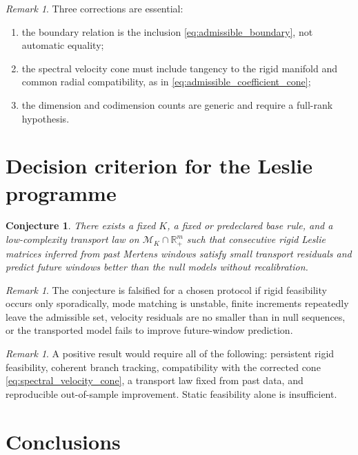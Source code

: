 \documentclass[11pt]{amsart}
\numberwithin{equation}{section}
\theoremstyle{plain}
\newtheorem{conjecture}[theorem]{Conjecture}
\theoremstyle{definition}
\theoremstyle{remark}
\newtheorem{remark}[theorem]{Remark}
\begin{document}
\begin{remark}
\label{rem:corrections}
Three corrections are essential:
\begin{enumerate}
\item the boundary relation is the inclusion \eqref{eq:admissible_boundary}, not automatic equality;
\item the spectral velocity cone must include tangency to the rigid manifold and common radial compatibility, as in \eqref{eq:admissible_coefficient_cone};
\item the dimension and codimension counts are generic and require a full-rank hypothesis.
\end{enumerate}
\end{remark}

\section{Decision criterion for the Leslie programme}
\label{sec:decision_criterion}

\begin{conjecture}
\label{conj:transportable_trajectory}
There exists a fixed $K$, a fixed or predeclared base rule, and a low-complexity transport law on $\mathcal M_K\cap\mathbb R_+^m$ such that consecutive rigid Leslie matrices inferred from past Mertens windows satisfy small transport residuals and predict future windows better than the null models without recalibration.
\end{conjecture}

\begin{remark}
\label{rem:falsification}
The conjecture is falsified for a chosen protocol if rigid feasibility occurs only sporadically, mode matching is unstable, finite increments repeatedly leave the admissible set, velocity residuals are no smaller than in null sequences, or the transported model fails to improve future-window prediction.
\end{remark}

\begin{remark}
\label{rem:success}
A positive result would require all of the following: persistent rigid feasibility, coherent branch tracking, compatibility with the corrected cone \eqref{eq:spectral_velocity_cone}, a transport law fixed from past data, and reproducible out-of-sample improvement.  Static feasibility alone is insufficient.
\end{remark}

\section{Conclusions}
\label{sec:conclusions}
\end{document}
